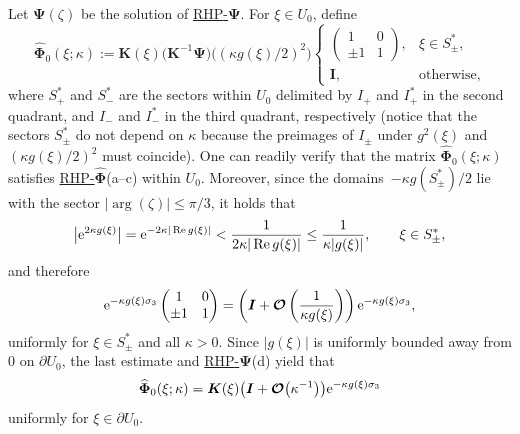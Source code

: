 \documentclass[10pt,a4paper]{amsart}
\numberwithin{equation}{section}
\newcommand{\re}{\operatorname{Re} }
\renewcommand{\arg}{\operatorname{arg}}
\newcommand{\rhpsi} {\textnormal{RHP}-${\boldsymbol \Psi}$}
\newcommand{\rhhphi} {\textnormal{RHP}-${\widehat{\boldsymbol \Phi}}$}
\begin{document}
Let $ \boldsymbol\Psi(\zeta) $ be the solution of \hyperref[rhpsi]{\rhpsi}. For $ \xi \in U_0 $, define
\[
 \widehat{\boldsymbol\Phi}_0(\xi;\kappa) := \boldsymbol K(\xi) \bigl(\boldsymbol K^{-1} \boldsymbol\Psi\bigr)\bigl( (\kappa g(\xi)/2 )^2 \bigr)
\begin{cases}
\begin{pmatrix} 1 & 0 \\ \pm 1 & 1 \end{pmatrix}, & \xi\in S_\pm^*, \\
\boldsymbol I, & \text{otherwise},
\end{cases}
\]
where $ S_+^* $ and $ S_-^* $ are the sectors within $ U_0 $ delimited by $ I_+ $ and $ I_+^* $ in the second quadrant, and $ I_- $ and $ I_-^* $ in the third quadrant, respectively (notice that the sectors $ S_\pm^* $ do not depend on $ \kappa $ because the preimages of $ I_\pm $ under $ g^2(\xi) $ and $ (\kappa g(\xi)/2)^2 $ must coincide). One can readily verify that the matrix $ \widehat{\boldsymbol\Phi}_0(\xi;\kappa) $ satisfies \hyperref[rhhphi]{\rhhphi}(a--c) within $ U_0 $. Moreover, since the domains~$ - \kappa g(S_\pm^*)/2 $ lie with the sector $ |\arg(\zeta)|\leq\pi/3 $, it holds that
\[
\big| {\rm e}^{2\kappa g(\xi)} \big| = {\rm e}^{-2\kappa|\re g(\xi)|} < \frac1{2\kappa |\re g(\xi)|} \leq \frac1{\kappa|g(\xi)|}, \qquad \xi\in S_\pm^*,
\]
and therefore
\[
{\rm e}^{-\kappa g(\xi)\sigma_3} \begin{pmatrix} 1 & 0 \\ \pm1 & 1 \end{pmatrix} = \left( \boldsymbol I + \boldsymbol{\mathcal O}\left(\frac1{\kappa g(\xi)}\right) \right) {\rm e}^{-\kappa g(\xi)\sigma_3},
\]
uniformly for $ \xi\in S_\pm^* $ and all $ \kappa>0 $. Since $ |g(\xi)| $ is uniformly bounded away from $ 0 $ on $ \partial U_0 $, the last estimate and \hyperref[rhpsi]{\rhpsi}(d) yield that
\[
\widehat{\boldsymbol\Phi}_0(\xi;\kappa) = \boldsymbol K(\xi) \bigl(\boldsymbol I + \boldsymbol{\mathcal O}\bigl(\kappa^{-1}\bigr) \bigr) {\rm e}^{-\kappa g(\xi)\sigma_3}
\]
uniformly for $ \xi\in\partial U_0 $.
\end{document}
